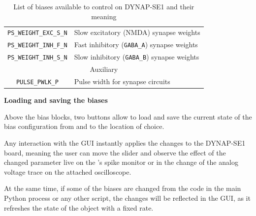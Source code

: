 \begin{table}[h!]
\begin{tabularx}{\textwidth}{|c|X|}
\verb|PS_WEIGHT_EXC_S_N| & Slow excitatory (NMDA) synapse weights\\ 
\verb|PS_WEIGHT_INH_F_N| & Fast inhibitory (\verb|GABA_A|) synapse weights\\ 
\verb|PS_WEIGHT_INH_S_N| & Slow inhibitory (\verb|GABA_B|) synapse weights\\ 
\hline
\multicolumn{2}{c}{Auxiliary} \\
\hline
\verb|PULSE_PWLK_P| & Pulse width for synapse circuits\\ 
\hline
\end{tabularx}
\label{tab:bias_names_list}
\caption{List of biases available to control on DYNAP-SE1 and their meaning}
\end{table}



\bigskip
\noindent\textbf{Loading and saving the biases}
\bigskip

Above the bias blocks, two buttons allow to load and save the current state of the bias configuration from and to the location of choice.

Any interaction with the GUI instantly applies the changes to the DYNAP-SE1 board, meaning the user can move the slider and observe the effect of the changed parameter live on the 's spike monitor or in the change of the analog voltage trace on the attached oscilloscope.

At the same time, if some of the biases are changed from the code in the main Python process or any other script, the changes will be reflected in the GUI, as it refreshes the state of the  object with a fixed rate.



